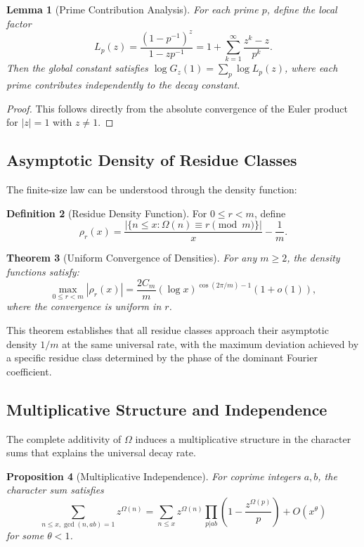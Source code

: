 \documentclass[12pt]{article}
\newtheorem{theorem}{Theorem}[section]
\newtheorem{lemma}[theorem]{Lemma}
\newtheorem{proposition}[theorem]{Proposition}
\theoremstyle{definition}
\newtheorem{definition}[theorem]{Definition}
\theoremstyle{remark}
\begin{document}
\begin{lemma}[Prime Contribution Analysis]
For each prime $p$, define the local factor
\[
L_p(z) = \frac{(1-p^{-1})^z}{1-zp^{-1}} = 1 + \sum_{k=1}^\infty \frac{z^k - z}{p^k}.
\]
Then the global constant satisfies $\log G_z(1) = \sum_p \log L_p(z)$, where each prime contributes independently to the decay constant.
\end{lemma}

\begin{proof}
This follows directly from the absolute convergence of the Euler product for $|z| = 1$ with $z \neq 1$.
\end{proof}

\subsection{Asymptotic Density of Residue Classes}

The finite-size law can be understood through the density function:

\begin{definition}[Residue Density Function]
For $0 \leq r < m$, define
\[
\rho_r(x) = \frac{|\{n \leq x : \Omega(n) \equiv r \pmod{m}\}|}{x} - \frac{1}{m}.
\]
\end{definition}

\begin{theorem}[Uniform Convergence of Densities]
For any $m \geq 2$, the density functions satisfy:
\[
\max_{0 \leq r < m} |\rho_r(x)| = \frac{2C_m}{m}(\log x)^{\cos(2\pi/m) - 1}(1 + o(1)),
\]
where the convergence is uniform in $r$.
\end{theorem}

This theorem establishes that all residue classes approach their asymptotic density $1/m$ at the same universal rate, with the maximum deviation achieved by a specific residue class determined by the phase of the dominant Fourier coefficient.

\subsection{Multiplicative Structure and Independence}

The complete additivity of $\Omega$ induces a multiplicative structure in the character sums that explains the universal decay rate.

\begin{proposition}[Multiplicative Independence]
For coprime integers $a, b$, the character sum satisfies
\[
\sum_{n \leq x, \gcd(n,ab)=1} z^{\Omega(n)} = \sum_{n \leq x} z^{\Omega(n)} \prod_{p|ab} \left(1 - \frac{z^{\Omega(p)}}{p}\right) + O(x^{\theta})
\]
for some $\theta < 1$.
\end{proposition}
\end{document}
